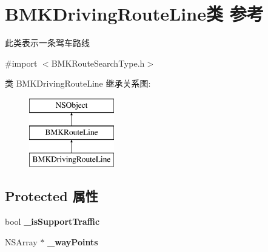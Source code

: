 \hypertarget{interface_b_m_k_driving_route_line}{\section{B\+M\+K\+Driving\+Route\+Line类 参考}
\label{interface_b_m_k_driving_route_line}
}


此类表示一条驾车路线  




{\ttfamily \#import $<$B\+M\+K\+Route\+Search\+Type.\+h$>$}

类 B\+M\+K\+Driving\+Route\+Line 继承关系图\+:\begin{figure}[H]
\begin{center}
\leavevmode
\includegraphics[height=3.000000cm]{interface_b_m_k_driving_route_line}
\end{center}
\end{figure}
\subsection*{Protected 属性}
\begin{DoxyCompactItemize}
\item 
\hypertarget{interface_b_m_k_driving_route_line_ac5d75fa8fdd883982c7870e821b93da0}{bool {\bfseries \+\_\+is\+Support\+Traffic}}\label{interface_b_m_k_driving_route_line_ac5d75fa8fdd883982c7870e821b93da0}

\item 
\hypertarget{interface_b_m_k_driving_route_line_a371d37ca24cff8e33b6f1540fdbab3a4}{N\+S\+Array $\ast$ {\bfseries \+\_\+way\+Points}}\label{interface_b_m_k_driving_route_line_a371d37ca24cff8e33b6f1540fdbab3a4}

\end{DoxyCompactItemize}
